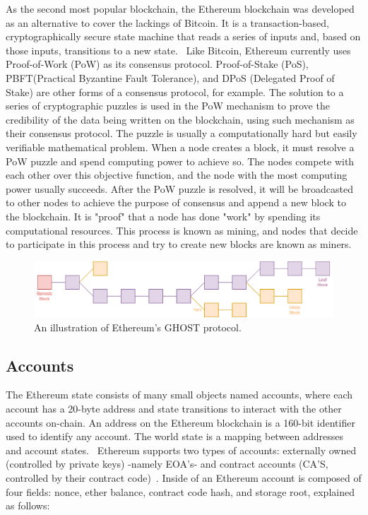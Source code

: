     As the second most popular blockchain, the Ethereum blockchain was developed as an alternative to cover the lackings of Bitcoin.
    It is a transaction-based, cryptographically secure state machine that reads a series of inputs and, based on those inputs, transitions to a new state.~\cite{ferreira2022smart}
    Like Bitcoin, Ethereum currently uses Proof-of-Work (PoW) as its consensus protocol.
    Proof-of-Stake (PoS), PBFT(Practical Byzantine Fault Tolerance), and DPoS (Delegated Proof of Stake) are other forms of a consensus protocol, for example.
    The solution to a series of cryptographic puzzles is used in the PoW mechanism to prove the credibility of the data being written on the blockchain, using such mechanism as their consensus protocol.
    The puzzle is usually a computationally hard but easily verifiable mathematical problem.
    When a node creates a block, it must resolve a PoW puzzle and spend computing power to achieve so. The nodes compete with each other over this objective function, and the node with the most computing power usually succeeds.
    After the PoW puzzle is resolved, it will be broadcasted to other nodes to achieve the purpose of consensus and append a new block to the blockchain.
    It is "proof" that a node has done "work" by spending its computational resources.
    This process is known as mining, and nodes that decide to participate in this process and try to create new blocks are known as miners.

    \begin{figure}
        \centering
        \includegraphics[width=\textwidth]{figures/uncle.png}
        \caption{An illustration of Ethereum's GHOST protocol.}
        \label{fig:uncle}
    \end{figure}

    \subsection{Accounts}
        The Ethereum state consists of many small objects named accounts, where each account has a 20-byte address and state transitions to interact with the other accounts on-chain.
        An address on the Ethereum blockchain is a 160-bit identifier used to identify any account.
        The world state is a mapping between addresses and account states.~\cite{wood2014ethereum}
        Ethereum supports two types of accounts: externally owned
        (controlled by private keys) -namely EOA's- and contract accounts (CA'S, controlled by their contract code)~\cite{ethereum2014ethereum}.
        Inside of an Ethereum account is composed of four fields: nonce, ether balance, contract code hash, and storage root, explained as follows:

